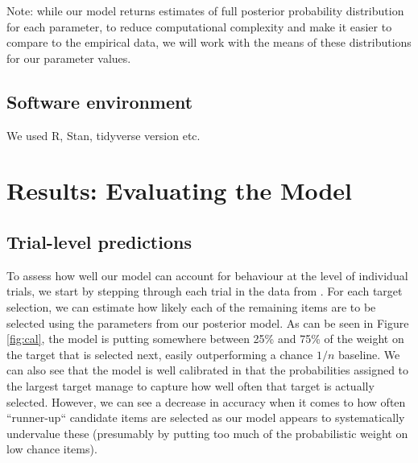 \documentclass[vision,article,submit,pdftex,moreauthors]{Definitions/mdpi}
\begin{document}
Note: while our model returns estimates of full posterior probability distribution for each parameter, to reduce computational complexity and make it easier to compare to the empirical data, we will work with the means of these distributions for our parameter values. 

\subsection{Software environment}
 
 We used R, Stan, tidyverse version etc. 

\section{Results: Evaluating the Model}

\subsection{Trial-level predictions}

To assess how well our model can account for behaviour at the level of individual trials, we start by stepping through each trial in the data from \cite{clarke2022}. For each target selection, we can estimate how likely each of the remaining items are to be selected using the parameters from our posterior model. As can be seen in Figure \ref{fig:cal}, the model is putting somewhere between 25\% and 75\% of the weight on the target that is selected next, easily outperforming a chance $1/n$ baseline. We can also see  that the model is well calibrated in that the probabilities assigned to the largest target manage to capture how well often that target is actually selected. However, we can see a decrease in accuracy when it comes to how often ``runner-up`` candidate items are selected as our model appears to systematically undervalue these (presumably by putting too much of the probabilistic weight on low chance items).
\end{document}
